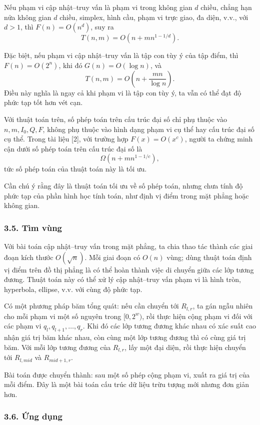 \documentclass[11pt]{article}
\begin{document}
Nếu phạm vi cập nhật--truy vấn là phạm vi trong không gian \(d\) chiều, chẳng
hạn nửa không gian \(d\) chiều, simplex, hình cầu, phạm vi trực giao, đa diện,
v.v., với \(d>1\), thì \(F(n)=O(n^d)\), suy ra
\[
  T(n,m)=O(n+mn^{1-1/d}).
\]

Đặc biệt, nếu phạm vi cập nhật--truy vấn là tập con tùy ý của tập điểm, thì
\(F(n)=O(2^n)\), khi đó \(G(n)=O(\log n)\), và
\[
  T(n,m)=O\left(n+\frac{mn}{\log n}\right).
\]
Điều này nghĩa là ngay cả khi phạm vi là tập con tùy ý, ta vẫn có thể đạt độ
phức tạp tốt hơn vét cạn.

Với thuật toán trên, số phép toán trên cấu trúc đại số chỉ phụ thuộc vào
\(n,m,I_0,Q,F\), không phụ thuộc vào hình dạng phạm vi cụ thể hay cấu trúc đại
số cụ thể. Trong tài liệu [2], với trường hợp \(F(x)=O(x^c)\), người ta chứng
minh cận dưới số phép toán trên cấu trúc đại số là
\[
  \Omega(n+mn^{1-1/c}),
\]
tức số phép toán của thuật toán này là tối ưu.

Cần chú ý rằng đây là thuật toán tối ưu về số phép toán, nhưng chưa tính độ
phức tạp của phần hình học tính toán, như định vị điểm trong mặt phẳng hoặc
không gian.

\subsubsection*{3.5. Tìm vùng}

Với bài toán cập nhật--truy vấn trong mặt phẳng, ta chia thao tác thành các
giai đoạn kích thước \(O(\sqrt n)\). Mỗi giai đoạn có \(O(n)\) vùng; dùng thuật
toán định vị điểm trên đồ thị phẳng là có thể hoàn thành việc di chuyển giữa
các lớp tương đương. Thuật toán này có thể xử lý cập nhật--truy vấn phạm vi là
hình tròn, hyperbola, ellipse, v.v. với cùng độ phức tạp.

Có một phương pháp băm tổng quát: nếu cần chuyển tới \(R_{l,r}\), ta gán ngẫu
nhiên cho mỗi phạm vi một số nguyên trong \([0,2^w)\), rồi thực hiện cộng phạm
vi đối với các phạm vi \(q_l,q_{l+1},\ldots,q_r\). Khi đó các lớp tương đương
khác nhau có xác suất cao nhận giá trị băm khác nhau, còn cùng một lớp tương
đương thì có cùng giá trị băm. Với mỗi lớp tương đương của \(R_{l,r}\), lấy một
đại diện, rồi thực hiện chuyển tới \(R_{l,\mathit{mid}}\) và
\(R_{\mathit{mid}+1,r}\).

Bài toán được chuyển thành: sau một số phép cộng phạm vi, xuất ra giá trị của
mỗi điểm. Đây là một bài toán cấu trúc dữ liệu trừu tượng mới nhưng đơn giản
hơn.

\subsubsection*{3.6. Ứng dụng}
\end{document}
